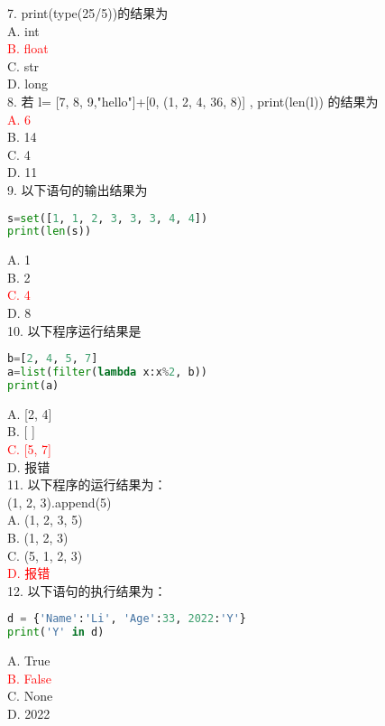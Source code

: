 \documentclass[6pt]{article}
\begin{document}
7. print(type(25/5))的结果为\\

A. int\\
\textcolor{red}{B. float}\\
C. str\\
D. long\\

8.  若 l= [7, 8, 9,"hello"]+[0, (1, 2, 4, 36, 8)] , print(len(l)) 的结果为\\

\textcolor{red}{A. 6}\\
B. 14\\
C. 4\\
D. 11\\

9. 以下语句的输出结果为\\
\begin{lstlisting}[language=Python]
s=set([1, 1, 2, 3, 3, 3, 4, 4])
print(len(s))
\end{lstlisting}
A. 1  \\
B. 2\\
\textcolor{red}{C. 4}\\
D. 8\\

10. 以下程序运行结果是\\

\begin{lstlisting}[language=Python]
b=[2, 4, 5, 7]
a=list(filter(lambda x:x%2, b))
print(a)
\end{lstlisting}
A. [2, 4]\\
B. [ ]\\
\textcolor{red}{C. [5, 7]}\\
D. 报错\\



11. 以下程序的运行结果为：\\

(1, 2, 3).append(5)\\
A. (1, 2, 3, 5)\\
B. (1, 2, 3)\\
C. (5, 1, 2, 3)\\
\textcolor{red}{D. 报错}\\

12. 以下语句的执行结果为：\\
\begin{lstlisting}[language=Python]
d = {'Name':'Li', 'Age':33, 2022:'Y'}
print('Y' in d)
\end{lstlisting}
A. True\\
\textcolor{red}{B. False}\\
C. None\\
D. 2022\\
\end{document}
